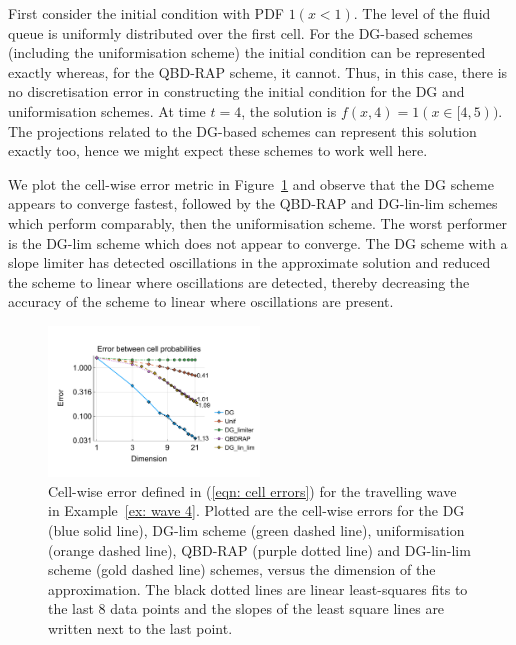 \begin{example}\label{ex: wave 4}
First consider the initial condition with PDF \(1(x<1)\). The level of the fluid queue is uniformly distributed over the first cell. For the DG-based schemes (including the uniformisation scheme) the initial condition can be represented exactly whereas, for the QBD-RAP scheme, it cannot. Thus, in this case, there is no discretisation error in constructing the initial condition for the DG and uniformisation schemes. At time \(t=4\), the solution is \(f(x,4)=1(x\in[4,5))\). The projections related to the DG-based schemes can represent this solution exactly too, hence we might expect these schemes to work well here. 

We plot the cell-wise error metric in Figure~\ref{fig: fun 4 wave cp} and observe that the DG scheme appears to converge fastest, followed by the QBD-RAP and DG-lin-lim schemes which perform comparably, then the uniformisation scheme. The worst performer is the DG-lim scheme which does not appear to converge. The DG scheme with a slope limiter has detected oscillations in the approximate solution and reduced the scheme to linear where oscillations are detected, thereby decreasing the accuracy of the scheme to linear where oscillations are present. 
\begin{figure}[h]
	\centering
	\includegraphics[width=0.5\textwidth,trim={0.75cm 0.8cm 0.25cm 1.25cm},clip]{chapter6/figs/wave/fun4/L1_cell_probs.pdf}
	\caption{Cell-wise error defined in (\ref{eqn: cell errors}) for the travelling wave in Example~\ref{ex: wave 4}. Plotted are the cell-wise errors for the DG (blue solid line), DG-lim scheme (green dashed line), uniformisation (orange dashed line), QBD-RAP (purple dotted line) and DG-lin-lim scheme (gold dashed line) schemes, versus the dimension of the approximation. The black dotted lines are linear least-squares fits to the last 8 data points and the slopes of the least square lines are written next to the last point.}
	\label{fig: fun 4 wave cp} 
\end{figure}


\end{example}
